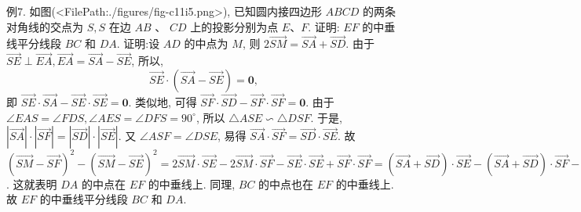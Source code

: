 例7. 如图(<FilePath:./figures/fig-c11i5.png>), 已知圆内接四边形 $A B C D$ 的两条对角线的交点为 $S, S$ 在边 $A B$ 、 $C D$ 上的投影分别为点 $E 、 F$. 证明: $E F$ 的中垂线平分线段 $B C$ 和 $D A$.
证明:设 $A D$ 的中点为 $M$, 则 $2 \overrightarrow{S M}=\overrightarrow{S A}+\overrightarrow{S D}$.
由于 $\overrightarrow{S E} \perp \overrightarrow{E A}, \overrightarrow{E A}=\overrightarrow{S A}-\overrightarrow{S E}$, 所以,
$$
\overrightarrow{S E} \cdot(\overrightarrow{S A}-\overrightarrow{S E})=\mathbf{0},
$$
即 $\overrightarrow{S E} \cdot \overrightarrow{S A}-\overrightarrow{S E} \cdot \overrightarrow{S E}=\mathbf{0}$. 类似地, 可得 $\overrightarrow{S F} \cdot \overrightarrow{S D}- \overrightarrow{S F} \cdot \overrightarrow{S F}=\mathbf{0}$.
由于 $\angle E A S=\angle F D S, \angle A E S=\angle D F S=90^{\circ}$, 所以 $\triangle A S E \backsim \triangle D S F$.
于是, $|\overrightarrow{S A}| \cdot|\overrightarrow{S F}|=|\overrightarrow{S D}| \cdot|\overrightarrow{S E}|$.
又 $\angle A S F=\angle D S E$, 易得 $\overrightarrow{S A} \cdot \overrightarrow{S F}=\overrightarrow{S D} \cdot \overrightarrow{S E}$.
故 $(\overrightarrow{S M}-\overrightarrow{S F})^2-(\overrightarrow{S M}-\overrightarrow{S E})^2=2 \overrightarrow{S M} \cdot \overrightarrow{S E}-2 \overrightarrow{S M} \cdot \overrightarrow{S F}-\overrightarrow{S E} \cdot \overrightarrow{S E}+ \overrightarrow{S F} \cdot \overrightarrow{S F}=(\overrightarrow{S A}+\overrightarrow{S D}) \cdot \overrightarrow{S E}-(\overrightarrow{S A}+\overrightarrow{S D}) \cdot \overrightarrow{S F}-\overrightarrow{S E} \cdot \overrightarrow{S E}+\overrightarrow{S F} \cdot \overrightarrow{S F}=\overrightarrow{S A} \cdot \overrightarrow{S E}-\overrightarrow{S E} \cdot \overrightarrow{S E}-(\overrightarrow{S D} \cdot \overrightarrow{S F}-\overrightarrow{S F} \cdot \overrightarrow{S F})-(\overrightarrow{S A} \cdot \overrightarrow{S F}-\overrightarrow{S D} \cdot \overrightarrow{S E})=0$.
这就表明 $D A$ 的中点在 $E F$ 的中垂线上.
同理, $B C$ 的中点也在 $E F$ 的中垂线上.
故 $E F$ 的中垂线平分线段 $B C$ 和 $D A$.



